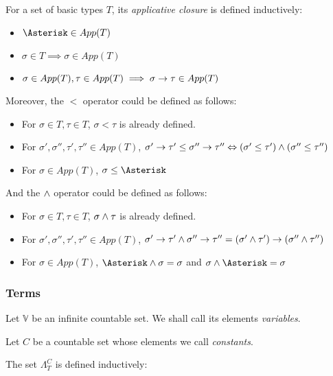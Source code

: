 \documentclass[main.tex]{subfiles}
\begin{document}
\begin{defn}
    For a set of basic types $T$, its \emph{applicative closure} is defined inductively:
    \begin{itemize}
        \item $\wildcard \in App(T)$
        \item $\sigma \in T \implies \sigma \in App(T)$
        \item $\sigma \in App(T), \tau \in App(T) \implies \sigma \rightarrow \tau \in App(T)$
    \end{itemize}

    Moreover, the $\less$ operator could be defined as follows:
    \begin{itemize}
        \item For $\sigma \in T, \tau \in T$, $\sigma \less \tau$ is already defined.
        \item For $\sigma', \sigma'', \tau', \tau'' \in App(T)$,
                  $\sigma' \rightarrow \tau' \leq \sigma'' \rightarrow \tau''
                  \Leftrightarrow (\sigma' \leq \tau') \land (\sigma'' \leq \tau'')$
        \item For $\sigma \in App(T)$, $\sigma \less \wildcard$
    \end{itemize}


    And the $\wedge$ operator could be defined as follows:
    \begin{itemize}
        \item For $\sigma \in T, \tau \in T$, $\sigma \wedge \tau$ is already defined.
        \item For $\sigma', \sigma'', \tau', \tau'' \in App(T)$,
                  $\sigma' \rightarrow \tau' \wedge \sigma'' \rightarrow \tau''
                  = (\sigma' \wedge \tau') \rightarrow (\sigma'' \wedge \tau'')$
        \item For $\sigma \in App(T)$, $\wildcard \meet \sigma = \sigma$
                                   and $\sigma \meet \wildcard = \sigma$
    \end{itemize}
\end{defn}

\subsubsection{Terms}
\begin{defn}
    Let $\mathbb{V}$ be an infinite countable set. We shall call its elements
    \emph{variables}.
\end{defn}

\begin{defn}
    Let $C$ be a countable set whose elements we call \emph{constants}.

    The set $\Lambda_T^C$ is defined inductively:

\end{defn}
\end{document}

